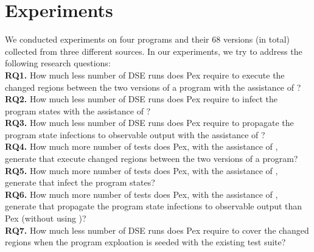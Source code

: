 \section{Experiments}
\label{sec:evaluation}

We conducted experiments on four programs and their 68 versions (in total) collected from three different sources. In our experiments, we try to address the following research questions:
\\ \textbf{RQ1.} How much less number of DSE runs does Pex require to execute the changed regions between the two versions of a program with the assistance of ?
	\\ \textbf{RQ2.} How much less number of DSE runs does Pex require to infect the program states with the assistance of ?
		\\ \textbf{RQ3.} How much less number of DSE runs does Pex require to propagate the program state infections to observable output with the assistance of ?
	\\ \textbf{RQ4.} How much more number of tests does Pex, with the assistance of , generate that execute changed regions between the two versions of a program?
	\\ \textbf{RQ5.} How much more number of tests does Pex, with the assistance of , generate that infect the program states?
	\\ \textbf{RQ6.} How much more number of tests does Pex, with the assistance of , generate that propagate the program state infections to observable output than Pex (without using )?
	\\ \textbf{RQ7.} How much less number of DSE runs does Pex require to cover the changed regions when the program exploation is seeded with the existing test suite?

